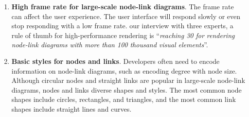 \begin{enumerate}[label*=\textbf{R\arabic*}]
\begin{enumerate}[label*=\textbf{.\arabic*}]
    \item 
        \textbf{Basic graph theory algorithms}.
        Graph algorithms play important roles in some scenarios.
        For example, some important measurements (e.g., node degree, node centrality) can highlight , and shortest\replaced[id=kg]{-}{ }path\replaced[id=kg]{-}{ }finding algorithms can help developers trace the association between two nodes.
    \label{R:algorithms}
\end{enumerate}

\item 
    \textbf{High frame rate for large-scale node-link diagrams}.
    The frame rate can affect the user experience.
    The user interface will respond slowly or even stop responding with a low frame rate.
     our interview with  three experts, a rule of thumb for high-performance rendering is ``\textit{reaching 30  for rendering node-link diagrams with more than 100 thousand visual elements}''.
\label{R:fps}

\item 
    \textbf{Basic styles for nodes and links}.
    Developers often need to encode information on node-link diagrams, such as encoding degree with node size.
    Although circular nodes and straight links are popular in large-scale node-link diagrams,  nodes and links  diverse shapes and styles.
    The most common node shapes include circles, rectangles, and triangles, and the most common link shapes include straight lines and curves.
\label{R:styles}


\end{enumerate}
